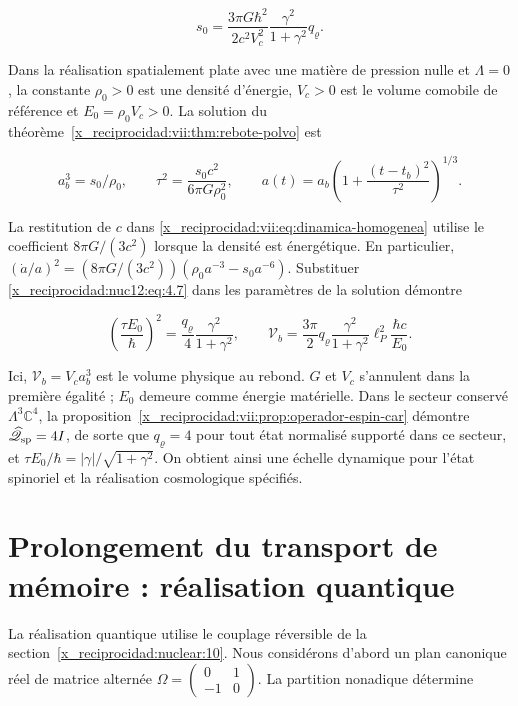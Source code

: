 \begin{equation}
s_0=\frac{3\pi G\hbar^2}{2c^2V_c^2}
\frac{\gamma^2}{1+\gamma^2}q_\varrho .
\label{x_reciprocidad:nuc12:eq:4.7}
\end{equation}



Dans la réalisation spatialement plate avec une matière de pression nulle et \(\Lambda=0\), la constante \(\rho_0>0\) est une densité d’énergie, \(V_c>0\) est le volume comobile de référence et \(E_0=\rho_0V_c>0\). La solution du théorème~\ref{x_reciprocidad:vii:thm:rebote-polvo} est



\[
a_b^3=s_0/\rho_0,\qquad
\tau^2=\frac{s_0c^2}{6\pi G\rho_0^2},\qquad
a(t)=a_b\left(1+\frac{(t-t_b)^2}{\tau^2}\right)^{1/3}.
\]



La restitution de \(c\) dans \eqref{x_reciprocidad:vii:eq:dinamica-homogenea} utilise le coefficient \(8\pi G/(3c^2)\) lorsque la densité est énergétique. En particulier, \((\dot a/a)^2=(8\pi G/(3c^2))(\rho_0a^{-3}-s_0a^{-6})\). Substituer \eqref{x_reciprocidad:nuc12:eq:4.7} dans les paramètres de la solution démontre



\begin{equation}
\boxed{\left(\frac{\tau E_0}{\hbar}\right)^2
=\frac{q_\varrho}{4}\frac{\gamma^2}{1+\gamma^2},\qquad
\mathcal V_b=\frac{3\pi}{2}q_\varrho
\frac{\gamma^2}{1+\gamma^2}\ell_P^2\frac{\hbar c}{E_0}.}
\label{x_reciprocidad:nuc12:eq:4.8}
\end{equation}



Ici, \(\mathcal V_b=V_c a_b^3\) est le volume physique au rebond. \(G\) et \(V_c\) s’annulent dans la première égalité ; \(E_0\) demeure comme énergie matérielle. Dans le secteur conservé \(\Lambda^3\mathbb C^4\), la proposition~\ref{x_reciprocidad:vii:prop:operador-espin-car} démontre \(\widehat{\mathscr Q}_{\rm sp}=4I\), de sorte que \(q_\varrho=4\) pour tout état normalisé supporté dans ce secteur, et
\(\tau E_0/\hbar=|\gamma|/\sqrt{1+\gamma^2}\).
On obtient ainsi une échelle dynamique pour l’état spinoriel et la réalisation cosmologique spécifiés.

\section{Prolongement du transport de mémoire : réalisation quantique}

La réalisation quantique utilise le couplage réversible de la section~\ref{x_reciprocidad:nuclear:10}. Nous considérons d’abord un plan canonique réel de matrice alternée \(\Omega=\left(\begin{smallmatrix}0&1\\-1&0\end{smallmatrix}\right)\). La partition nonadique détermine



